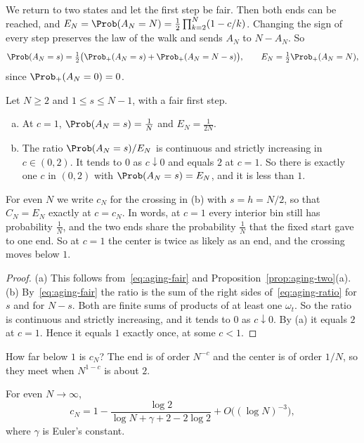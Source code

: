 We return to two states and let the first step be fair. Then both ends can be
reached, and $E_N=\Prob(A_N=N)=\frac12\prod_{k=2}^N(1-c/k)$. Changing the sign
of every step preserves the law of the walk and sends $A_N$ to $N-A_N$. So
\begin{equation}\label{eq:aging-fair}
 \Prob(A_N=s)=\tfrac12\bigl(\Prob_+(A_N=s)+\Prob_+(A_N=N-s)\bigr),\qquad
 E_N=\tfrac12\Prob_+(A_N=N),
\end{equation}
since $\Prob_+(A_N=0)=0$.

\begin{proposition}\label{prop:aging-fair}
Let $N\ge2$ and $1\le s\le N-1$, with a fair first step.
\begin{enumerate}[(a)]
\item At $c=1$, $\Prob(A_N=s)=\frac1N$ and $E_N=\frac1{2N}$.
\item The ratio $\Prob(A_N=s)/E_N$ is continuous and strictly increasing in
$c\in(0,2)$. It tends to $0$ as $c\downarrow0$ and equals $2$ at $c=1$. So
there is exactly one $c$ in $(0,2)$ with $\Prob(A_N=s)=E_N$, and it is less
than $1$.
\end{enumerate}
\end{proposition}

For even $N$ we write $c_N$ for the crossing in (b) with $s=h=N/2$, so that
$C_N=E_N$ exactly at $c=c_N$. In words, at $c=1$ every interior bin still has
probability $\frac1N$, and the two ends share the probability $\frac1N$ that
the fixed start gave to one end. So at $c=1$ the center is twice as likely as
an end, and the crossing moves below $1$.

\begin{proof}
(a) This follows from~\eqref{eq:aging-fair} and
Proposition~\ref{prop:aging-two}(a). (b) By~\eqref{eq:aging-fair} the ratio
is the sum of the right sides of~\eqref{eq:aging-ratio} for $s$ and for
$N-s$. Both are finite sums of products of at least one $\omega_t$. So the
ratio is continuous and strictly increasing, and it tends to $0$ as
$c\downarrow0$. By (a) it equals $2$ at $c=1$. Hence it equals $1$ exactly
once, at some $c<1$.
\end{proof}

How far below $1$ is $c_N$? The end is of order $N^{-c}$ and the center is of
order $1/N$, so they meet when $N^{1-c}$ is about $2$.

\begin{proposition}\label{prop:aging-expansion}
For even $N\to\infty$,
\[
 c_N=1-\frac{\log2}{\log N+\gamma+2-2\log2}+O\bigl((\log N)^{-3}\bigr),
\]
where $\gamma$ is Euler's constant.
\end{proposition}

